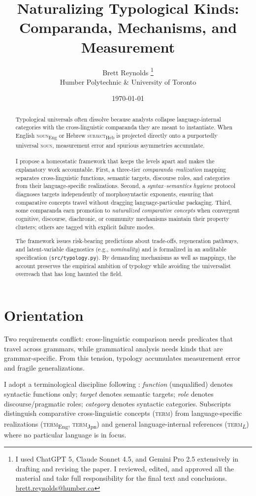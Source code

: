 \documentclass[12pt]{article}
\title{Naturalizing Typological Kinds:\\Comparanda, Mechanisms, and Measurement}
\author{Brett Reynolds \orcidlink{0000-0003-0073-7195}\thanks{I used ChatGPT 5, Claude Sonnet 4.5, and Gemini Pro 2.5 extensively in drafting and revising the paper. I reviewed, edited, and approved all the material and take full responsibility for the final text and conclusions. \href{mailto:brett.reynolds@humber.ca}{brett.reynolds@humber.ca}}\\Humber Polytechnic \& University of Toronto}
\date{\today}
\begin{document}
\maketitle


\begin{abstract}
Typological universals often dissolve because analysts collapse language-internal categories with the cross-linguistic comparanda they are meant to instantiate. When English \textsc{noun}\textsubscript{Eng} or Hebrew \textsc{subject}\textsubscript{Heb} is projected directly onto a purportedly universal \textsc{noun}\textsubscript{\Cross}, measurement error and spurious asymmetries accumulate.

I propose a homeostatic framework that keeps the levels apart and makes the explanatory work accountable. First, a three-tier \emph{comparanda--realization} mapping separates cross-linguistic functions, semantic targets, discourse roles, and categories from their language-specific realizations. Second, a \emph{syntax--semantics hygiene} protocol diagnoses targets independently of morphosyntactic exponents, ensuring that comparative concepts travel without dragging language-particular packaging. Third, some comparanda earn promotion to \emph{naturalized comparative concepts} when convergent cognitive, discourse, diachronic, or community mechanisms maintain their property clusters; others are tagged with explicit failure modes.

The framework issues risk-bearing predictions about trade-offs, regeneration pathways, and latent-variable diagnostics (e.g., \emph{nominality}) and is formalized in an auditable specification (\texttt{src/typology.py}). By demanding mechanisms as well as mappings, the account preserves the empirical ambition of typology while avoiding the universalist overreach that has long haunted the field.
\end{abstract}

\section{Orientation}\label{sec:orientation}
Two requirements conflict: cross-linguistic comparison needs predicates that travel across grammars, while grammatical analysis needs kinds that are grammar-specific. From this tension, typology accumulates measurement error and fragile generalizations.

I adopt a terminological discipline following \textcite{HuddlestonPullum2002}: \emph{function} (unqualified) denotes syntactic functions only; \emph{target} denotes semantic targets; \emph{role} denotes discourse/pragmatic roles; \emph{category} denotes syntactic categories. Subscripts distinguish comparative cross-linguistic concepts (\textsc{term}\textsubscript{\Cross}) from language-specific realizations (\textsc{term}\textsubscript{Eng}, \textsc{term}\textsubscript{Jpn}) and general language-internal references (\textsc{term}\textsubscript{$L$}) where no particular language is in focus.
\end{document}
